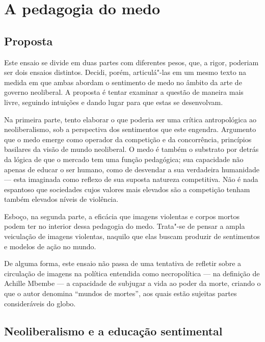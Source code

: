 \chapter{A pedagogia do medo}

\section*{Proposta}

Este ensaio se divide em duas partes com diferentes pesos, que, a rigor, poderiam ser dois ensaios distintos. Decidi, porém,
articulá"-las em um mesmo texto na medida em que ambas abordam o
sentimento de medo no âmbito da arte de governo neoliberal. A proposta é
tentar examinar a questão de maneira mais livre, seguindo intuições e dando lugar
para que estas se desenvolvam.

Na primeira parte, tento elaborar o que poderia ser uma crítica
antropológica ao neoliberalismo, sob a perspectiva dos sentimentos que
este engendra. Argumento que o medo emerge como operador da competição e
da concorrência, princípios basilares da visão de mundo neoliberal. O
medo é também o substrato por detrás da lógica de que o mercado tem uma
função pedagógica; sua capacidade não apenas de educar o ser humano,
como de desvendar a sua verdadeira humanidade --- esta imaginada como reflexo de
sua suposta natureza competitiva. Não é nada espantoso que sociedades
cujos valores mais elevados são a competição tenham também elevados
níveis de violência.

Esboço, na segunda parte, a eficácia que imagens violentas e corpos
mortos podem ter no interior dessa pedagogia do medo. Trata"-se de pensar
a ampla veiculação de imagens violentas, naquilo que elas buscam
produzir de sentimentos e modelos de ação no mundo.

De alguma forma, este ensaio não
passa de uma tentativa de refletir sobre a circulação de imagens na política
entendida como necropolítica --- na definição de Achille Mbembe --- a capacidade de subjugar a vida ao poder da morte, criando o
que o autor denomina ``mundos de mortes'', aos quais estão sujeitas partes
consideráveis do globo.

\pagebreak

\section*{Neoliberalismo e a educação sentimental}

